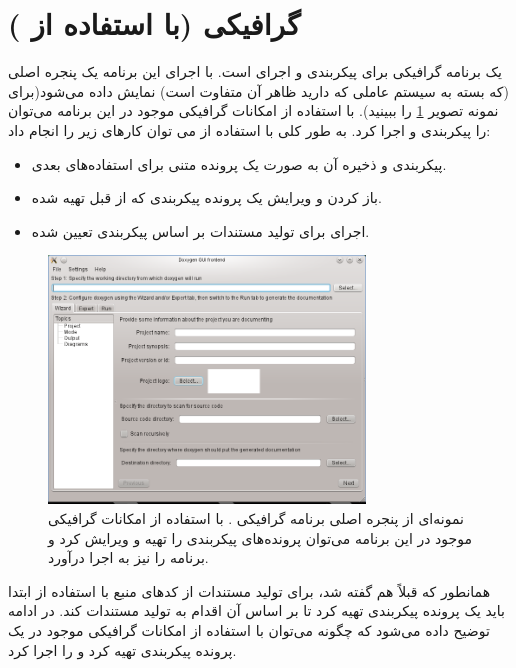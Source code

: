 \section{
گرافیکی (با استفاده از )
} 
یک برنامه گرافیکی برای پیکربندی و اجرای  است. با اجرای این برنامه یک پنجره اصلی 
(که بسته به سیستم عاملی که دارید ظاهر آن متفاوت است) نمایش داده می‌شود(برای نمونه تصویر \ref{پنجره_داکسی_ویزارد} را ببینید). 
با استفاده از امکانات گرافیکی موجود در این برنامه می‌توان  را پیکربندی و اجرا کرد. به طور کلی با استفاده 
از  می توان کارهای زیر را انجام داد: 
\begin{itemize}
 \item
پیکربندی  و ذخیره آن به صورت یک پرونده متنی برای استفاده‌های بعدی.
\item
باز کردن و ویرایش یک پرونده پیکربندی که از قبل تهیه شده.
\item
اجرای  برای تولید مستندات بر اساس پیکربندی تعیین شده.
\end{itemize}

\begin{figure}
\centering
\includegraphics[width=0.75\textwidth]{image/doxywizard_linux}
\caption[نمونه‌ای از پنجره اصلی برنامه گرافیکی .]
{
نمونه‌ای از پنجره اصلی برنامه گرافیکی . با استفاده از امکانات گرافیکی موجود در این برنامه می‌توان پرونده‌های پیکربندی را تهیه و ویرایش کرد و برنامه  را نیز به اجرا درآورد.
}
\label{پنجره_داکسی_ویزارد}
\end{figure}


همانطور که قبلاً هم گفته شد، برای تولید مستندات از کدهای منبع با استفاده از  ابتدا 
باید یک پرونده پیکربندی تهیه کرد تا  بر اساس آن اقدام به تولید مستندات کند. در ادامه 
توضیح داده می‌شود که چگونه می‌توان با استفاده از امکانات گرافیکی موجود در  یک پرونده 
پیکربندی تهیه کرد و  را اجرا کرد.

